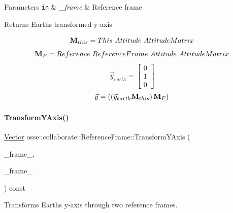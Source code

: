 \begin{DoxyParams}[1]{Parameters}
\mbox{\tt in}  & {\em \+\_\+frame} & Reference frame \\
\hline
\end{DoxyParams}
\begin{DoxyReturn}{Returns}
Earth\textquotesingle{}s transformed y-\/axis
\end{DoxyReturn}
\[ {\bf{M}}_{this} = This~Attitude~AttitudeMatrix \] \[ {\bf{M}}_{F} = Reference~ReferenceFrame~Attitude~AttitudeMatrix \] \[ \vec{y}_{earth} = \begin{bmatrix} 0 \\ 1 \\ 0 \end{bmatrix} \] \[ \vec{y} = \left(\left(\vec{y}_{earth}{\bf{M}}_{this}\right){\bf{M}}_{F}\right) \] \mbox{\label{classosse_1_1collaborate_1_1_reference_frame_a7f321d33340f957142db898ce6d91b7a}} 
\paragraph{\texorpdfstring{Transform\+Y\+Axis()}{TransformYAxis()}\hspace{0.1cm}{\footnotesize\ttfamily [2/2]}}
{\footnotesize\ttfamily \hyperlink{classosse_1_1collaborate_1_1_vector}{Vector} osse\+::collaborate\+::\+Reference\+Frame\+::\+Transform\+Y\+Axis (\begin{DoxyParamCaption}\item[{const \hyperlink{classosse_1_1collaborate_1_1_reference_frame}{Reference\+Frame} \&}]{\+\_\+frame\+\_,  }\item[{const \hyperlink{classosse_1_1collaborate_1_1_reference_frame}{Reference\+Frame} \&}]{\+\_\+frame\+\_ }\end{DoxyParamCaption}) const\hspace{0.3cm}{\ttfamily [private]}}



Transforms Earth\textquotesingle{}s y-\/axis through two reference frames. 


